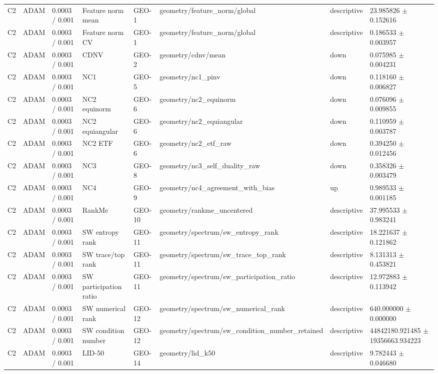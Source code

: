 \begin{longtable}{llllllll}
C2 & ADAM & 0.0003 / 0.001 & Feature norm mean & GEO-1 & geometry/feature\_norm/global & descriptive & 23.985826 $\pm$ 0.152616 \\
C2 & ADAM & 0.0003 / 0.001 & Feature norm CV & GEO-1 & geometry/feature\_norm/global & descriptive & 0.186533 $\pm$ 0.003957 \\
C2 & ADAM & 0.0003 / 0.001 & CDNV & GEO-2 & geometry/cdnv/mean & down & 0.075985 $\pm$ 0.004231 \\
C2 & ADAM & 0.0003 / 0.001 & NC1 & GEO-5 & geometry/nc1\_pinv & down & 0.118160 $\pm$ 0.006827 \\
C2 & ADAM & 0.0003 / 0.001 & NC2 equinorm & GEO-6 & geometry/nc2\_equinorm & down & 0.076096 $\pm$ 0.009855 \\
C2 & ADAM & 0.0003 / 0.001 & NC2 equiangular & GEO-6 & geometry/nc2\_equiangular & down & 0.110959 $\pm$ 0.003787 \\
C2 & ADAM & 0.0003 / 0.001 & NC2 ETF & GEO-6 & geometry/nc2\_etf\_raw & down & 0.394250 $\pm$ 0.012456 \\
C2 & ADAM & 0.0003 / 0.001 & NC3 & GEO-8 & geometry/nc3\_self\_duality\_raw & down & 0.358326 $\pm$ 0.003479 \\
C2 & ADAM & 0.0003 / 0.001 & NC4 & GEO-9 & geometry/nc4\_agreement\_with\_bias & up & 0.989533 $\pm$ 0.001185 \\
C2 & ADAM & 0.0003 / 0.001 & RankMe & GEO-10 & geometry/rankme\_uncentered & descriptive & 37.995533 $\pm$ 0.983241 \\
C2 & ADAM & 0.0003 / 0.001 & SW entropy rank & GEO-11 & geometry/spectrum/sw\_entropy\_rank & descriptive & 18.221637 $\pm$ 0.121862 \\
C2 & ADAM & 0.0003 / 0.001 & SW trace/top rank & GEO-11 & geometry/spectrum/sw\_trace\_top\_rank & descriptive & 8.131313 $\pm$ 0.453821 \\
C2 & ADAM & 0.0003 / 0.001 & SW participation ratio & GEO-11 & geometry/spectrum/sw\_participation\_ratio & descriptive & 12.972883 $\pm$ 0.113942 \\
C2 & ADAM & 0.0003 / 0.001 & SW numerical rank & GEO-12 & geometry/spectrum/sw\_numerical\_rank & descriptive & 640.000000 $\pm$ 0.000000 \\
C2 & ADAM & 0.0003 / 0.001 & SW condition number & GEO-12 & geometry/spectrum/sw\_condition\_number\_retained & descriptive & 44842180.921485 $\pm$ 19356663.934223 \\
C2 & ADAM & 0.0003 / 0.001 & LID-50 & GEO-14 & geometry/lid\_k50 & descriptive & 9.782443 $\pm$ 0.046680 \\

\end{longtable}
